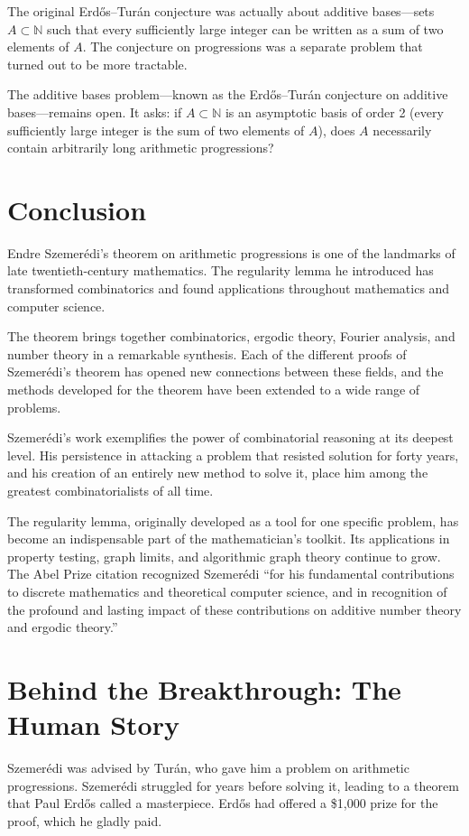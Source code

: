 The original Erd\H{o}s--Tur\'an conjecture was actually about additive bases---sets $A \subset \mathbb{N}$ such that every sufficiently large integer can be written as a sum of two elements of $A$. The conjecture on progressions was a separate problem that turned out to be more tractable.

The additive bases problem---known as the Erd\H{o}s--Tur\'an conjecture on additive bases---remains open. It asks: if $A \subset \mathbb{N}$ is an asymptotic basis of order 2 (every sufficiently large integer is the sum of two elements of $A$), does $A$ necessarily contain arbitrarily long arithmetic progressions?

\section{Conclusion}

Endre Szemer\'edi's theorem on arithmetic progressions is one of the landmarks of late twentieth-century mathematics. The regularity lemma he introduced has transformed combinatorics and found applications throughout mathematics and computer science.

The theorem brings together combinatorics, ergodic theory, Fourier analysis, and number theory in a remarkable synthesis. Each of the different proofs of Szemer\'edi's theorem has opened new connections between these fields, and the methods developed for the theorem have been extended to a wide range of problems.

Szemer\'edi's work exemplifies the power of combinatorial reasoning at its deepest level. His persistence in attacking a problem that resisted solution for forty years, and his creation of an entirely new method to solve it, place him among the greatest combinatorialists of all time.

The regularity lemma, originally developed as a tool for one specific problem, has become an indispensable part of the mathematician's toolkit. Its applications in property testing, graph limits, and algorithmic graph theory continue to grow. The Abel Prize citation recognized Szemer\'edi ``for his fundamental contributions to discrete mathematics and theoretical computer science, and in recognition of the profound and lasting impact of these contributions on additive number theory and ergodic theory.''

\section{Behind the Breakthrough: The Human Story}
Szemer\'edi was advised by Tur\'an, who gave him a problem on arithmetic progressions. Szemer\'edi struggled for years before solving it, leading to a theorem that Paul Erd\H{o}s called a masterpiece. Erd\H{o}s had offered a \$1,000 prize for the proof, which he gladly paid.

